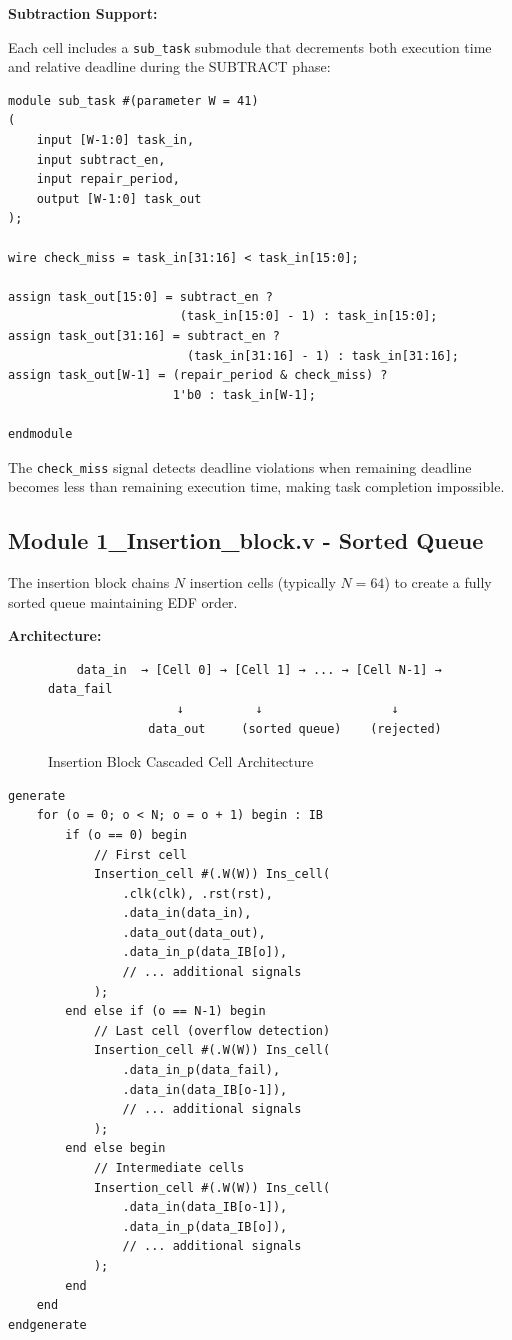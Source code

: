 \documentclass[12pt,a4paper]{article}
\begin{document}
\textbf{Subtraction Support:}

Each cell includes a \texttt{sub\_task} submodule that decrements both execution time and relative deadline during the SUBTRACT phase:

\begin{lstlisting}[style=verilog, caption={Deadline and Execution Decrement}]
module sub_task #(parameter W = 41)
(
    input [W-1:0] task_in,
    input subtract_en,
    input repair_period,
    output [W-1:0] task_out
);

wire check_miss = task_in[31:16] < task_in[15:0];

assign task_out[15:0] = subtract_en ?
                        (task_in[15:0] - 1) : task_in[15:0];
assign task_out[31:16] = subtract_en ?
                         (task_in[31:16] - 1) : task_in[31:16];
assign task_out[W-1] = (repair_period & check_miss) ?
                       1'b0 : task_in[W-1];

endmodule
\end{lstlisting}

The \texttt{check\_miss} signal detects deadline violations when remaining deadline becomes less than remaining execution time, making task completion impossible.

\subsection{Module 1\_Insertion\_block.v - Sorted Queue}

The insertion block chains $N$ insertion cells (typically $N=64$) to create a fully sorted queue maintaining EDF order.

\textbf{Architecture:}

\begin{figure}[H]
\centering
\begin{verbatim}
    data_in  → [Cell 0] → [Cell 1] → ... → [Cell N-1] → data_fail
                  ↓          ↓                  ↓
              data_out     (sorted queue)    (rejected)
\end{verbatim}
\caption{Insertion Block Cascaded Cell Architecture}
\end{figure}

\begin{lstlisting}[style=verilog, caption={Insertion Block Generate Statement}]
generate
    for (o = 0; o < N; o = o + 1) begin : IB
        if (o == 0) begin
            // First cell
            Insertion_cell #(.W(W)) Ins_cell(
                .clk(clk), .rst(rst),
                .data_in(data_in),
                .data_out(data_out),
                .data_in_p(data_IB[o]),
                // ... additional signals
            );
        end else if (o == N-1) begin
            // Last cell (overflow detection)
            Insertion_cell #(.W(W)) Ins_cell(
                .data_in_p(data_fail),
                .data_in(data_IB[o-1]),
                // ... additional signals
            );
        end else begin
            // Intermediate cells
            Insertion_cell #(.W(W)) Ins_cell(
                .data_in(data_IB[o-1]),
                .data_in_p(data_IB[o]),
                // ... additional signals
            );
        end
    end
endgenerate
\end{lstlisting}
\end{document}
